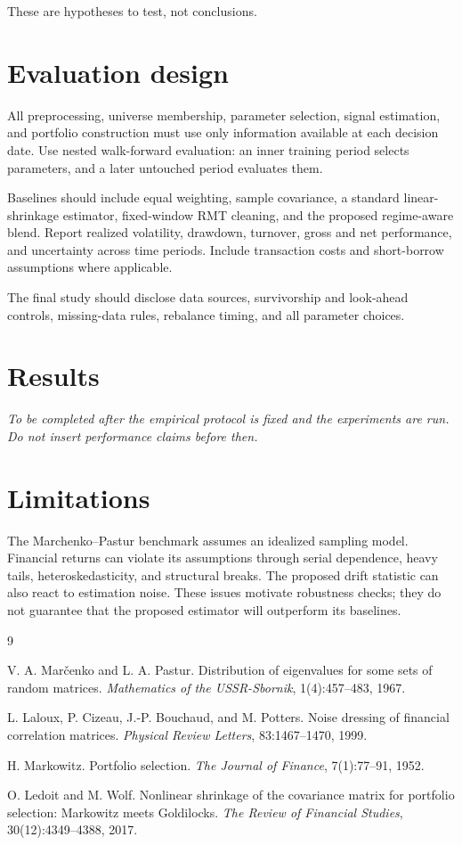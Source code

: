 \documentclass[11pt]{article}
\begin{document}
These are hypotheses to test, not conclusions.

\section{Evaluation design}

All preprocessing, universe membership, parameter selection, signal estimation,
and portfolio construction must use only information available at each decision
date. Use nested walk-forward evaluation: an inner training period selects
parameters, and a later untouched period evaluates them.

Baselines should include equal weighting, sample covariance, a standard
linear-shrinkage estimator, fixed-window RMT cleaning, and the proposed
regime-aware blend. Report realized volatility, drawdown, turnover, gross and
net performance, and uncertainty across time periods. Include transaction costs
and short-borrow assumptions where applicable.

The final study should disclose data sources, survivorship and look-ahead
controls, missing-data rules, rebalance timing, and all parameter choices.

\section{Results}

\textit{To be completed after the empirical protocol is fixed and the experiments
are run. Do not insert performance claims before then.}

\section{Limitations}

The Marchenko--Pastur benchmark assumes an idealized sampling model. Financial
returns can violate its assumptions through serial dependence, heavy tails,
heteroskedasticity, and structural breaks. The proposed drift statistic can also
react to estimation noise. These issues motivate robustness checks; they do not
guarantee that the proposed estimator will outperform its baselines.

\begin{thebibliography}{9}

V. A. Mar\v{c}enko and L. A. Pastur.
Distribution of eigenvalues for some sets of random matrices.
\textit{Mathematics of the USSR-Sbornik}, 1(4):457--483, 1967.

L. Laloux, P. Cizeau, J.-P. Bouchaud, and M. Potters.
Noise dressing of financial correlation matrices.
\textit{Physical Review Letters}, 83:1467--1470, 1999.

H. Markowitz.
Portfolio selection.
\textit{The Journal of Finance}, 7(1):77--91, 1952.

O. Ledoit and M. Wolf.
Nonlinear shrinkage of the covariance matrix for portfolio selection:
Markowitz meets Goldilocks.
\textit{The Review of Financial Studies}, 30(12):4349--4388, 2017.

\end{thebibliography}
\end{document}

